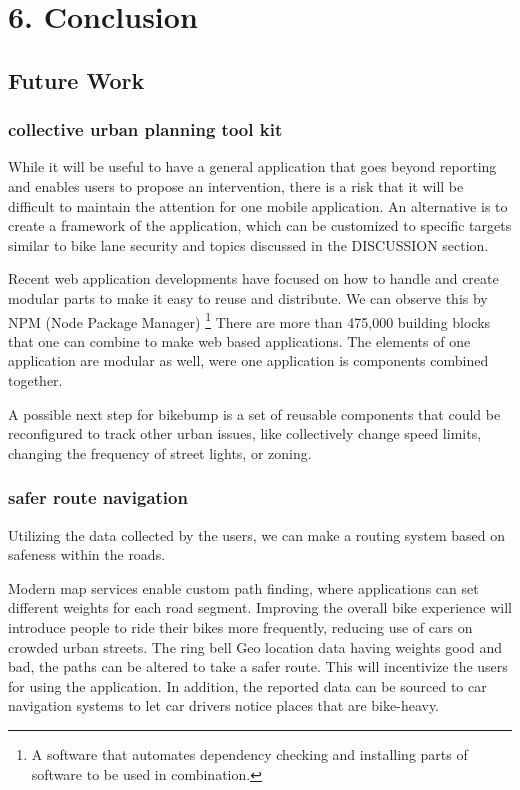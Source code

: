 \chapter{6. Conclusion}

\section{Future Work}
\label{sec:future}

\subsection{collective urban planning tool kit}

While it will be useful to have a general application that goes beyond reporting and enables users to propose an intervention,
there is a risk that it will be difficult to maintain the attention for one mobile application.
An alternative is to create a framework of the application, which can be customized to specific
targets similar to bike lane security and topics discussed in the DISCUSSION section.


Recent web application developments have focused on how to handle and create modular parts to make it easy to reuse and distribute. We can observe this by NPM (Node Package Manager)
\footnote{A software that automates dependency checking and installing parts of software to be used in combination.}
There are more than 475,000
building blocks that one can combine to make web based applications. The elements of one application are modular as well, were one application is components combined together.

A possible next step for bikebump is a set of reusable components that could be reconfigured to track other urban issues, like collectively change speed limits, changing the frequency of street lights, or zoning.


\subsection{safer route navigation}
Utilizing the data collected by the users, we can make a routing system based on safeness within the roads.

Modern map services enable custom path finding, where applications can set different weights for each road segment. Improving the overall bike experience will introduce people to ride their bikes more frequently, reducing use of cars on crowded urban streets. 
The ring bell Geo location data having weights good and bad, the paths can be altered to take a safer route.
This will incentivize the users for using the application. In addition, the reported data can be sourced to car navigation systems to let car drivers notice places that are bike-heavy.


